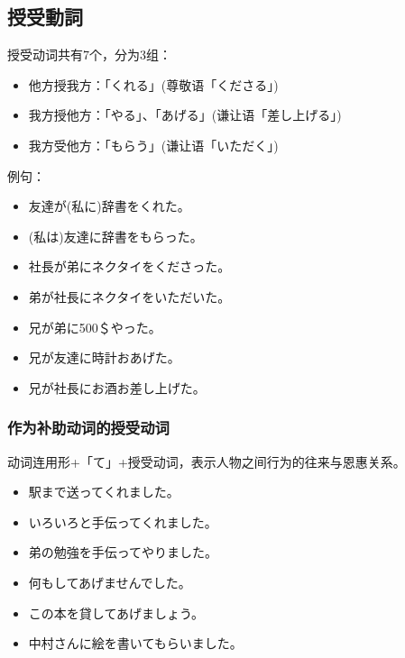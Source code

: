 \subsection{授受動詞}%

授受动词共有7个，分为3组：
\begin{itemize}
  \item 他方授我方：「くれる」(尊敬语「くださる」)
  \item 我方授他方：「やる」、「あげる」(谦让语「差し上げる」)
  \item 我方受他方：「もらう」(谦让语「いただく」)
\end{itemize}

例句：
\begin{itemize}
  \item 友達が(私に)辞書をくれた。
  \item (私は)友達に辞書をもらった。
  \item 社長が弟にネクタイをくださった。
  \item 弟が社長にネクタイをいただいた。
  \item 兄が弟に500＄やった。
  \item 兄が友達に時計おあげた。
  \item 兄が社長にお酒お差し上げた。
\end{itemize}


\subsubsection{作为补助动词的授受动词}%

动词连用形+「て」+授受动词，表示人物之间行为的往来与恩惠关系。
\begin{itemize}
  \item 駅まで送ってくれました。
  \item いろいろと手伝ってくれました。
  \item 弟の勉強を手伝ってやりました。
  \item 何もしてあげませんでした。
  \item この本を貸してあげましょう。
  \item 中村さんに絵を書いてもらいました。
\end{itemize}




